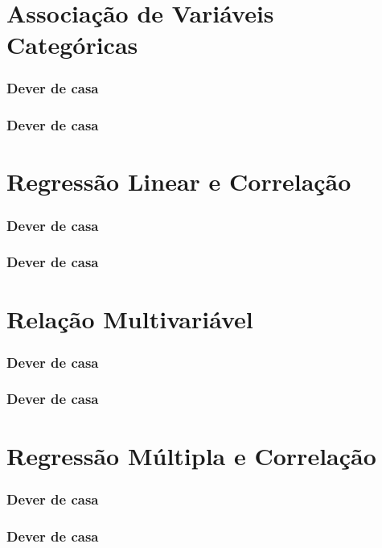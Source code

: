 \documentclass[graphics,14pt]{beamer}
\begin{document}
\section{Associação de Variáveis Categóricas}
\begin{frame}[t,fragile=singleslide]
\frametitle{Dever de casa}
\end{frame}
\begin{frame}[t,fragile=singleslide]
\frametitle{Dever de casa}
\end{frame}
\section{Regressão Linear e Correlação}
\begin{frame}[t,fragile=singleslide]
\frametitle{Dever de casa}
\end{frame}
\begin{frame}[t,fragile=singleslide]
\frametitle{Dever de casa}
\end{frame}
\section{Relação Multivariável}
\begin{frame}[t,fragile=singleslide]
\frametitle{Dever de casa}
\end{frame}
\begin{frame}[t,fragile=singleslide]
\frametitle{Dever de casa}
\end{frame}
\section{Regressão Múltipla e Correlação}
\begin{frame}[t,fragile=singleslide]
\frametitle{Dever de casa}
\end{frame}
\begin{frame}[t,fragile=singleslide]
\frametitle{Dever de casa}
\end{frame}
\end{document}
